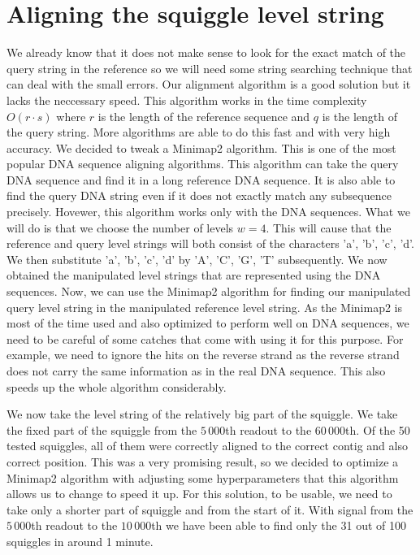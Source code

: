 \section{Aligning the squiggle level string}
\label{section:alignMinimap}

We already know that it does not make sense to look for the exact match of the query string in the reference
so we will need some string searching technique that can deal with the small errors.
Our alignment algorithm is a good solution but it lacks the neccessary speed. This
algorithm works in the time complexity $O(r\cdot s)$ where $r$ is the length of the
reference sequence and $q$ is the length of the query string. More algorithms are able
to do this fast and with very high accuracy. We decided to tweak a Minimap2 \cite{li2018minimap2} algorithm. This is
one of the most popular DNA sequence aligning algorithms. This algorithm can take the
query DNA sequence and find it in a long reference DNA sequence. It is also able to
find the query DNA string even if it does not exactly match any subsequence precisely.
Hovewer, this algorithm works only with the DNA sequences. What we will do is that we choose
the number of levels $w=4$. This will cause that the reference and query level strings will both consist of
the characters 'a', 'b', 'c', 'd'. We then substitute 'a', 'b', 'c', 'd' by
'A', 'C', 'G', 'T' subsequently. We now obtained the manipulated level strings that
are represented using the DNA sequences. Now, we can use the Minimap2 algorithm for
finding our manipulated query level string in the manipulated reference level string.
As the Minimap2 is most of the time used and also optimized to perform well on DNA
sequences, we need to be careful of some catches that come with using it for this
purpose. For example, we need to ignore the hits on the reverse strand as the
reverse strand does not carry the same information as in the real DNA sequence.
This also speeds up the whole algorithm considerably.

We now take the level string of the relatively big part of the squiggle. We take the
fixed part of the squiggle from the $5\,000$th readout to the $60\,000$th. Of the 50
tested squiggles, all of them were correctly aligned to the correct contig and also
correct position. This was a very promising result, so we decided to optimize a
Minimap2 algorithm with adjusting some hyperparameters that this algorithm allows us
to change to speed it up. For this solution, to be usable, we need to take only
a shorter part of squiggle and from the start of it. With signal from the $5\,000$th
readout to the $10\,000$th we have been able to find only the 31 out of 100 squiggles
in around 1 minute.


